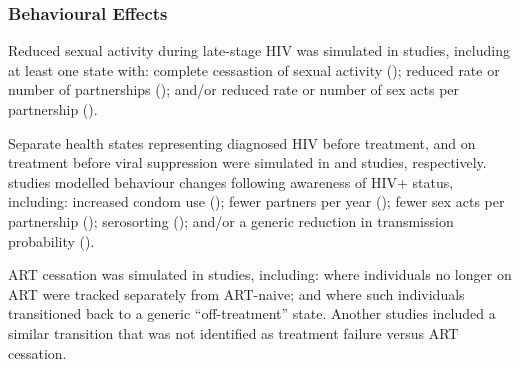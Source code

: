 \subsubsection{Behavioural Effects}
\label{sss:res:beh}
Reduced sexual activity during late-stage HIV was simulated in  studies,
including at least one state with:
complete cessastion of sexual activity ();
reduced rate or number of partnerships (); and/or
reduced rate or number of sex acts per partnership ().
\par
Separate health states representing diagnosed HIV before treatment,
and on treatment before viral suppression were simulated in
 and  studies, respectively.
 studies modelled behaviour changes following awareness of HIV+ status, including:
increased condom use ();
fewer partners per year ();
fewer sex acts per partnership ();
serosorting (); and/or
a generic reduction in transmission probability ().
\par
ART cessation was simulated in  studies, including:
 where individuals no longer on ART
were tracked separately from ART-naive; and
 where such individuals
transitioned back to a generic ``off-treatment'' state.
Another  studies included a similar transition
that was not identified as treatment failure versus ART cessation.
